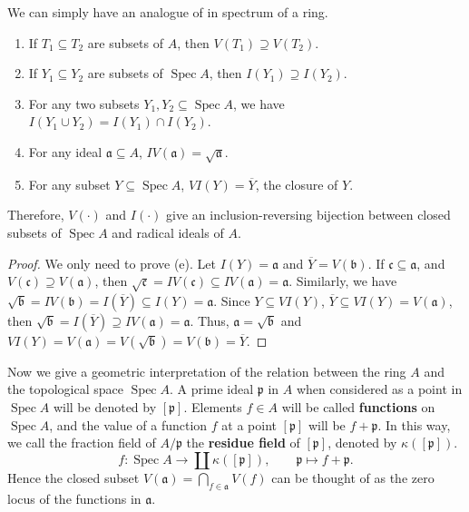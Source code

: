 \documentclass[11pt]{article}
\newcommand{\Spec}{\operatorname{Spec}}
\begin{document}
We can simply have an analogue of \cite[Proposition I.1.2]{hartsAG} in spectrum of a ring. 

\begin{corollary}
    \label{cor: correspondence radical ideals closed subsets}
    \cite[Theorem 3.7.1]{vakilTheRisingSea}
    \begin{enumerate}[label = (\alph*)]
        \item If $ T_{1} \subseteq T_{2} $ are subsets of $ A $, then $ V(T_{1}) \supseteq V(T_{2}) $. 
        \item If $ Y_{1} \subseteq Y_{2} $ are subsets of $ \Spec A $, then $ I(Y_{1}) \supseteq I(Y_{2}) $.
        \item For any two subsets $ Y_{1},Y_{2} \subseteq \Spec A $, we have 
        $ I(Y_{1} \cup Y_{2})=I(Y_{1}) \cap I(Y_{2}) $. 
        \item For any ideal $ \mathfrak{a} \subseteq A $, $ IV(\mathfrak{a}) =\sqrt{\mathfrak{a}} $. 
        \item For any subset $ Y \subseteq \Spec A $, $ VI(Y) = \overline{Y} $, 
        the closure of $ Y $. 
    \end{enumerate}
    Therefore, $ V(\cdot) $ and $ I(\cdot) $ give an inclusion-reversing bijection between closed
    subsets of $ \Spec A $ and radical ideals of $ A $. 
\end{corollary}

\begin{proof}
    We only need to prove (e). 
    Let $I(Y)=\mathfrak{a}$ and $\overline{Y}=V(\mathfrak{b})$. 
    If $\mathfrak{c} \subseteq \mathfrak{a}$, and $V(\mathfrak{c})\supseteq V(\mathfrak{a})$, 
    then $\sqrt{\mathfrak{c}}=IV(\mathfrak{c})\subseteq IV(\mathfrak{a})=\mathfrak{a}$. 
    Similarly, we have $ \sqrt{\mathfrak{b}} = IV(\mathfrak{b}) = I(\overline{Y}) \subseteq I(Y)=\mathfrak{a} $. 
    Since $Y \subseteq VI(Y)$, $\overline{Y} \subseteq VI(Y)=V(\mathfrak{a})$, 
    then $\sqrt{\mathfrak{b}}=I(\overline{Y}) \supseteq IV(\mathfrak{a})=\mathfrak{a}$. 
    Thus, $\mathfrak{a}=\sqrt{\mathfrak{b}}$ and $VI(Y)=V(\mathfrak{a})=V(\sqrt{\mathfrak{b}})=V(\mathfrak{b})=\overline{Y   }$. 
\end{proof}

Now we give a geometric interpretation of the relation between the ring $ A $ and the topological space 
$ \Spec A $. A prime ideal $ \mathfrak{p} $ in $ A $ when considered as a point in $ \Spec A $ 
will be denoted by $ [\mathfrak{p}] $. Elements $ f \in A $ will be called \textbf{functions} 
on $ \Spec A $, and the value of a function $ f $ at a point $ [\mathfrak{p}] $ will be 
$ f+ \mathfrak{p}$. In this way, we call the fraction field of $ A / \mathfrak{p} $ 
the \textbf{residue field} of $ [\mathfrak{p}] $, denoted by $ \kappa([\mathfrak{p}]) $. 
$$ f: \Spec A \to \coprod \kappa([\mathfrak{p}]), \qquad  \mathfrak{p} \mapsto f+ \mathfrak{p}. $$ 
Hence the closed subset $ V(\mathfrak{a})=\bigcap_{f \in \mathfrak{a}} V(f) $ can be thought of as 
the zero locus of the functions in $ \mathfrak{a} $. 
\end{document}
